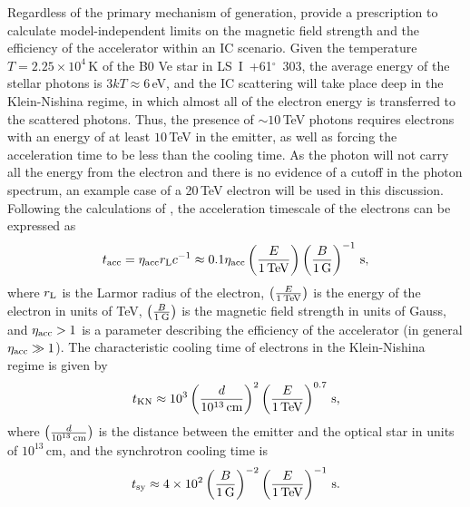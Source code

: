 \documentclass[preprint2]{aastex}
\newcommand{\lsi}{LS~I~+61$^{\circ}$~303}
\newcommand{\tev}{\,TeV}
\begin{document}
Regardless of the primary mechanism of generation, \citet{2008MNRAS.383..467K} provide a prescription to calculate model-independent limits on the magnetic field strength and the efficiency of the accelerator within an IC scenario. %
Given the temperature $T=2.25\times10^4$\,K \citep{2013A&ARv..21...64D} of the B0 Ve star in \lsi{}, the average energy of the stellar photons is $3kT \approx 6$\,eV, and the IC scattering will take place deep in the Klein-Nishina regime, in which almost all of the electron energy is transferred to the scattered photons. Thus, the presence of $\sim10$\tev{} photons requires electrons with an energy of at least $10$\tev{} in the emitter, as well as forcing the acceleration time to be less than the cooling time. As the photon will not carry all the energy from the electron and there is no evidence of a cutoff in the photon spectrum, an example case of a 20\tev{} electron will be used in this discussion. Following the calculations of \citet{2008MNRAS.383..467K}, the acceleration timescale of the electrons can be expressed as
\begin{equation}
t_{\mbox{\scriptsize{acc}}} = \eta_{\mbox{\scriptsize{acc}}} r_{\mbox{\scriptsize{L}}} c^{-1} \approx 0.1 \eta_{\mbox{\scriptsize{acc}}} \left( \frac{E}{1\mbox{\,TeV}} \right) \left( \frac{B}{1\mbox{\,G}} \right)^{-1} \mbox{\,s},
\label{taccel}
\end{equation}
where $r_{\mbox{\scriptsize{L}}}$ is the Larmor radius of the electron, $\left( \frac{E}{1\mbox{\,\scriptsize TeV}} \right)$ is the energy of the electron in units of TeV, $\left( \frac{B}{1\mbox{\,\scriptsize G}} \right)$ is the magnetic field strength in units of Gauss, and $\eta_{\mbox{\scriptsize{acc}}} > 1$ is a parameter describing the efficiency of the accelerator (in general $\eta_{\mbox{\scriptsize{acc}}} \gg 1$). The characteristic cooling time of electrons in the Klein-Nishina regime is given by
\begin{equation}
t_{\mbox{\scriptsize{KN}}} \approx 10^3 \left( \frac{d}{10^{13}\mbox{\,cm}} \right)^2 \left( \frac{E}{1\mbox{\,TeV}} \right)^{0.7} \mbox{\,s},
\end{equation}
where $\left( \frac{d}{10^{13}\mbox{\,\scriptsize cm}} \right)$ is the distance between the emitter and the optical star in units of $10^{13}$\,cm, and the synchrotron cooling time is 
\begin{equation}
t_{\mbox{\scriptsize{sy}}} \approx 4\times10^2 \left( \frac{B}{1\mbox{\,G}} \right)^{-2} \left( \frac{E}{1\mbox{\,TeV}} \right)^{-1} \mbox{\,s}.
\end{equation}
\end{document}
